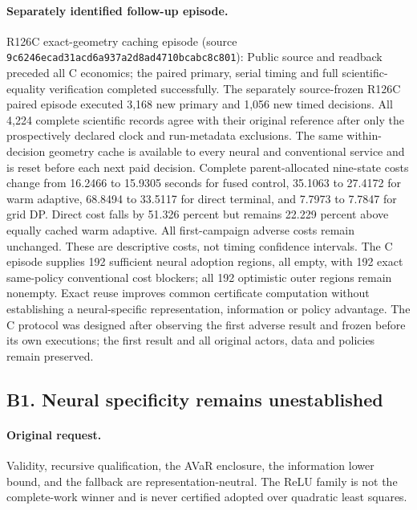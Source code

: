 \paragraph{Separately identified follow-up episode.} R126C exact-geometry caching episode (source \nolinkurl{9c6246ecad31acd6a937a2d8ad4710bcabc8c801}): Public source and readback preceded all C economics; the paired primary, serial timing and full scientific-equality verification completed successfully. The separately source-frozen R126C paired episode executed 3,168 new primary and 1,056 new timed decisions. All 4,224 complete scientific records agree with their original reference after only the prospectively declared clock and run-metadata exclusions. The same within-decision geometry cache is available to every neural and conventional service and is reset before each next paid decision. Complete parent-allocated nine-state costs change from 16.2466 to 15.9305 seconds for fused control, 35.1063 to 27.4172 for warm adaptive, 68.8494 to 33.5117 for direct terminal, and 7.7973 to 7.7847 for grid DP. Direct cost falls by 51.326 percent but remains 22.229 percent above equally cached warm adaptive. All first-campaign adverse costs remain unchanged. These are descriptive costs, not timing confidence intervals. The C episode supplies 192 sufficient neural adoption regions, all empty, with 192 exact same-policy conventional cost blockers; all 192 optimistic outer regions remain nonempty. Exact reuse improves common certificate computation without establishing a neural-specific representation, information or policy advantage. The C protocol was designed after observing the first adverse result and frozen before its own executions; the first result and all original actors, data and policies remain preserved.

\subsection*{B1. Neural specificity remains unestablished}
\paragraph{Original request.} Validity, recursive qualification, the AVaR enclosure, the information lower bound, and the fallback are representation-neutral. The ReLU family is not the complete-work winner and is never certified adopted over quadratic least squares.

